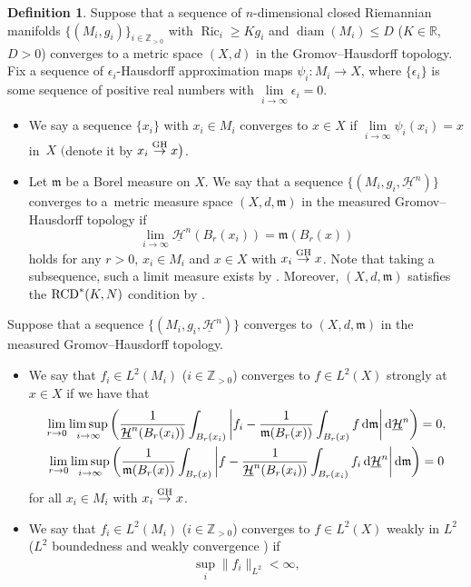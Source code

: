 \documentclass[pdftex]{sigma}
\numberwithin{equation}{section}
\theoremstyle{definition}
\newtheorem{Def}[Thm]{Definition}
\newcommand{\Ric}{\operatorname{Ric}}
\newcommand{\diam}{\operatorname{diam}}
\newcommand{\R}{\mathbb{R}}
\newcommand{\Z}{\mathbb{Z}}
\newcommand{\mf}{\mathfrak{m}}
\newcommand{\RCD}{{\rm RCD}^\ast}
\newcommand{\nHa}{\underline{\mathcal{H}}}
\begin{document}
\begin{Def}
Suppose that a sequence of $n$-dimensional closed Riemannian manifolds $\{(M_i,g_i)\}_{i\in \Z_{>0}}$ with $\Ric_i\geq K g_i$ and $\diam (M_i)\leq D$ ($K\in \R$, $D>0$) converges to a metric space $(X,d)$ in the Gromov--Hausdorff topology.
Fix a sequence of $\epsilon_i$-Hausdorff approximation maps $\psi_i\colon M_i\to X$, where $\{\epsilon_i\}$ is some sequence of positive real numbers with $\lim\limits_{i\to \infty}\epsilon_i=0$.
\begin{itemize}\itemsep=0pt
\item We say a sequence $\{x_i\}$ with $x_i\in M_i$ converges to $x\in X$ if $\lim\limits_{i\to \infty}\psi_i(x_i)= x$ in~$X$ $\big($denote it by $x_i\stackrel{{\rm GH}}{\to} x\big)$.
\item Let $\mf$ be a Borel measure on $X$.
We say that a sequence $\{(M_i,g_i,\nHa^n)\}$ converges to a~metric measure space $(X,d,\mf)$ in the measured Gromov--Hausdorff topology if
\[
\lim_{i\to \infty}\nHa^n(B_r(x_i))=\mf (B_r(x))
\]
holds for any $r>0$, $x_i\in M_i$ and $x\in X$ with $x_i \stackrel{{\rm GH}}{\to} x$.
Note that taking a subsequence, such a limit measure exists by \cite[Theorems~1.6 and~1.10]{CC1}.
Moreover, $(X,d,\mf)$ satisfies the $\RCD(K,N)$ condition by \cite[Theorem~3.22]{EKS}.
\end{itemize}
Suppose that a sequence $\{(M_i,g_i,\nHa^n)\}$ converges to $(X,d,\mf)$ in the measured Gromov--Haus\-dorff topology.
\begin{itemize}\itemsep=0pt
\item We say that $f_i\in L^2(M_i)$ ($i\in\Z_{>0}$) converges to $f\in L^2(X)$ strongly at $x\in X$ \cite[Defi\-nition~3.7]{Ho1} if we have that
\begin{gather*}
\lim_{r\to 0}\limsup_{i\to \infty}\bigg(\frac{1}{\nHa^n(B_r (x_i))}\int_{B_r(x_i)}\bigg|f_i-\frac{1}{\mf(B_r(x))}\int_{B_r(x)}f\,{\rm d}\mf\bigg|\,{\rm d}\nHa^n\bigg)=0,
\\
\lim_{r\to 0}\limsup_{i\to \infty}\bigg(\frac{1}{\mf(B_r (x))}\int_{B_r(x)}\bigg|f-\frac{1}{\nHa^n(B_r(x_i))}\int_{B_r(x_i)}f_i\,{\rm d}\nHa^n\bigg|\,{\rm d}\mf\bigg)=0
\end{gather*}
for all $x_i\in M_i$ with $x_i \stackrel{{\rm GH}}{\to} x$.
\item We say that $f_i\in L^2(M_i)$ ($i\in\Z_{>0}$) converges to $f\in L^2(X)$ weakly in $L^2$ ($L^2$ boundedness and weakly convergence \cite[Definition~3.4 and~Proposition~3.17]{Ho1}) if
\begin{gather*}
\sup_{i}\|f_i\|_{L^2}<\infty,

\end{gather*}
\end{itemize}
\end{Def}
\end{document}
